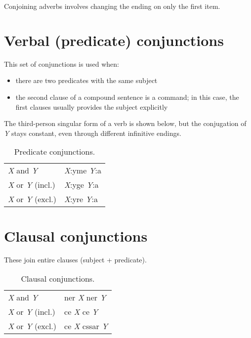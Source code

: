 \documentclass{book}
\begin{document}
Conjoining adverbs involves changing the ending on only the first item.

\section{Verbal (predicate) conjunctions}

This set of conjunctions is used when:

\begin{itemize}
	\item there are two predicates with the same subject
	\item the second clause of a compound sentence is a command; in this case, the first clauses usually provides the subject explicitly
\end{itemize}

The third-person singular form of a  verb is shown below, but the conjugation of \emph{Y} stays constant, even through different infinitive endings.

\begin{table}[ht]
  \caption{Predicate conjunctions.}
  \centering
	\begin{tabular}{|l|l|}
	  \hline
	  \emph{X} and \emph{Y} & \emph{X}:yme \emph{Y}:a \\
	  \emph{X} or \emph{Y} (incl.) & \emph{X}:yge \emph{Y}:a \\
	  \emph{X} or \emph{Y} (excl.) & \emph{X}:yre \emph{Y}:a \\ \hline
	\end{tabular}
\end{table}

\section{Clausal conjunctions}

These join entire clauses (subject + predicate).

\begin{table}[ht]
  \caption{Clausal conjunctions.}
  \centering
	\begin{tabular}{|l|l|}
	  \hline
	  \emph{X} and \emph{Y} & ner \emph{X} ner \emph{Y} \\
	  \emph{X} or \emph{Y} (incl.) & ce \emph{X} ce \emph{Y} \\
	  \emph{X} or \emph{Y} (excl.) & ce \emph{X} cssar \emph{Y} \\ \hline
	\end{tabular}
\end{table}
\end{document}
